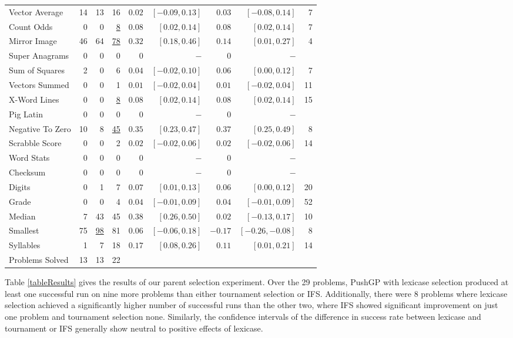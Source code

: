 \documentclass{sig-alternate}
\begin{document}
\begin{table*}[t]
\begin{tabular}{lrrr|rrrr|r}
Vector Average             & 14      & 13  & 16       & $0.02$ & $[-0.09, 0.13]$ & $0.03$ & $[-0.08, 0.14]$ & 7 \tabularnewline
Count Odds                 & 0       & 0   & \underline{8}        & $0.08$ & $[0.02, 0.14]$ & $0.08$ & $[0.02, 0.14]$ & 7 \tabularnewline
Mirror Image               & 46      & 64  & \underline{78}       & $0.32$ & $[0.18, 0.46]$ & $0.14$ & $[0.01, 0.27]$ & 4 \tabularnewline
Super Anagrams             & 0       & 0   & 0        & $0$ & $-$ & $0$ & $-$ &  \tabularnewline
Sum of Squares             & 2       & 0   & 6        & $0.04$ & $[-0.02, 0.10]$ & $0.06$ & $[0.00, 0.12]$ & 7 \tabularnewline
Vectors Summed             & 0       & 0   & 1        & $0.01$ & $[-0.02, 0.04]$ & $0.01$ & $[-0.02, 0.04]$ & 11 \tabularnewline
X-Word Lines               & 0       & 0   & \underline{8}        & $0.08$ & $[0.02, 0.14]$ & $0.08$ & $[0.02, 0.14]$ & 15 \tabularnewline
Pig Latin                  & 0       & 0   & 0        &   $0$ & $-$ & $0$ & $-$ &  \tabularnewline
Negative To Zero           & 10      & 8   & \underline{45}       & $0.35$ & $[0.23, 0.47]$ & $0.37$ & $[0.25, 0.49]$ & 8 \tabularnewline
Scrabble Score             & 0       & 0   & 2        & $0.02$ & $[-0.02, 0.06]$ & $0.02$ & $[-0.02, 0.06]$ & 14 \tabularnewline
Word Stats                 & 0       & 0   & 0        & $0$ & $-$ & $0$ & $-$ &  \tabularnewline
Checksum                   & 0       & 0   & 0        &  $0$ & $-$ & $0$ & $-$ &  \tabularnewline
Digits                     & 0       & 1   & 7        & $0.07$ & $[0.01, 0.13]$ & $0.06$ & $[0.00, 0.12]$ & 20 \tabularnewline
Grade                      & 0       & 0   & 4        & $0.04$ & $[-0.01, 0.09]$ & $0.04$ & $[-0.01, 0.09]$ & 52 \tabularnewline
Median                     & 7       & 43  & 45       & $0.38$ & $[0.26, 0.50]$ & $0.02$ & $[-0.13, 0.17]$ & 10 \tabularnewline
Smallest                   & 75      & \underline{98}  & 81       & $0.06$ & $[-0.06, 0.18]$ & $-0.17$ & $[-0.26, -0.08]$ & 8 \tabularnewline
Syllables                  & 1       & 7   & 18       & $0.17$ & $[0.08, 0.26]$ & $0.11$ & $[0.01, 0.21]$ & 14 \tabularnewline
\midrule
\rowcolor{white} Problems Solved          & 13       & 13      & 22 & & & & &   \\
\bottomrule
\end{tabular}
\end{table*}


Table \ref{tableResults} gives the results of our parent selection experiment. Over the 29 problems, PushGP with lexicase selection produced at least one successful run on nine more problems than either tournament selection or IFS. Additionally, there were 8 problems where lexicase selection achieved a significantly higher number of successful runs than the other two, where IFS showed significant improvement on just one problem and tournament selection none. Similarly, the confidence intervals of the difference in success rate between lexicase and tournament or IFS generally show neutral to positive effects of lexicase.
\end{document}
